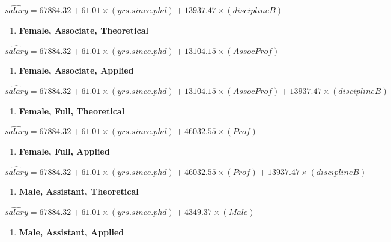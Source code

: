 \documentclass[
]{article}
\providecommand{\tightlist}{%
  \setlength{\itemsep}{0pt}\setlength{\parskip}{0pt}}
\begin{document}
\(\hat{salary} = 67884.32 + 61.01 \times (yrs.since.phd) + 13937.47 \times (disciplineB)\)

\begin{enumerate}
\def\labelenumi{\arabic{enumi}.}
\setcounter{enumi}{2}
\tightlist
\item
  \textbf{Female, Associate, Theoretical}
\end{enumerate}

\(\hat{salary} = 67884.32 + 61.01 \times (yrs.since.phd) + 13104.15 \times (AssocProf)\)

\begin{enumerate}
\def\labelenumi{\arabic{enumi}.}
\setcounter{enumi}{3}
\tightlist
\item
  \textbf{Female, Associate, Applied}
\end{enumerate}

\(\hat{salary} = 67884.32 + 61.01 \times (yrs.since.phd) + 13104.15 \times (AssocProf) + 13937.47 \times (disciplineB)\)

\begin{enumerate}
\def\labelenumi{\arabic{enumi}.}
\setcounter{enumi}{4}
\tightlist
\item
  \textbf{Female, Full, Theoretical}
\end{enumerate}

\(\hat{salary} = 67884.32 + 61.01 \times (yrs.since.phd) + 46032.55 \times (Prof)\)

\begin{enumerate}
\def\labelenumi{\arabic{enumi}.}
\setcounter{enumi}{5}
\tightlist
\item
  \textbf{Female, Full, Applied}
\end{enumerate}

\(\hat{salary} = 67884.32 + 61.01 \times (yrs.since.phd) + 46032.55 \times (Prof) + 13937.47 \times (disciplineB)\)

\begin{enumerate}
\def\labelenumi{\arabic{enumi}.}
\setcounter{enumi}{6}
\tightlist
\item
  \textbf{Male, Assistant, Theoretical}
\end{enumerate}

\(\hat{salary} = 67884.32 + 61.01 \times (yrs.since.phd) + 4349.37 \times (Male)\)

\begin{enumerate}
\def\labelenumi{\arabic{enumi}.}
\setcounter{enumi}{7}
\tightlist
\item
  \textbf{Male, Assistant, Applied}
\end{enumerate}
\end{document}
